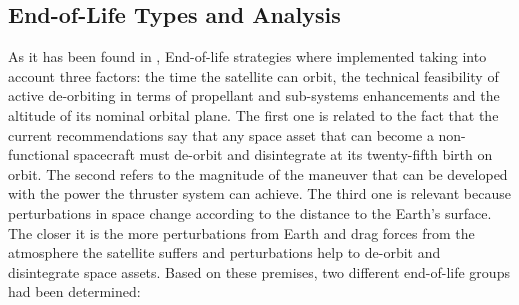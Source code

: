 \subsection{End-of-Life Types and Analysis}

As it has been found in \cite{cornara}, End-of-life strategies where implemented taking into account three factors: the time the satellite can orbit, the technical feasibility of active de-orbiting in terms of propellant and sub-systems enhancements and the altitude of its nominal orbital plane. 
\newline
\newline
The first one is related to the fact that the current recommendations say that any space asset that can become a non-functional spacecraft must de-orbit and disintegrate at its twenty-fifth birth on orbit. The second refers to the magnitude of the maneuver that can be developed with the power the thruster system can achieve. The third one is relevant because perturbations in space change according to the distance to the Earth’s surface. The closer it is the more perturbations from Earth and drag forces from the atmosphere the satellite suffers and perturbations help to de-orbit and disintegrate space assets.
\newline
\newline
Based on these premises, two different end-of-life groups had been determined: 

